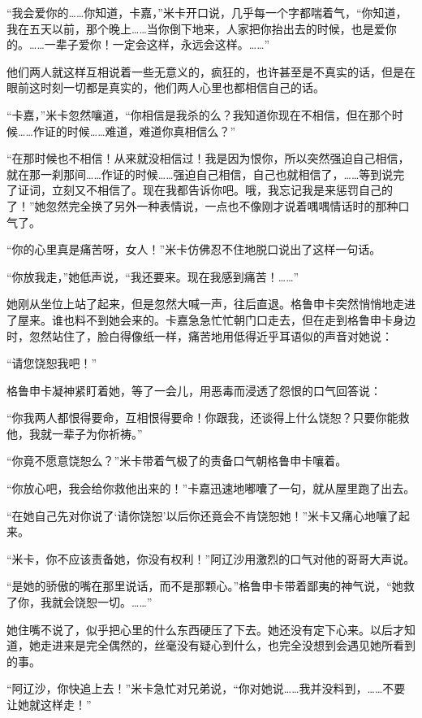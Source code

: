 \par “我会爱你的……你知道，卡嘉，”米卡开口说，几乎每一个字都喘着气，“你知道，我在五天以前，那个晚上……当你倒下地来，人家把你抬出去的时候，也是爱你的。……一辈子爱你！一定会这样，永远会这样。……”
\par 他们两人就这样互相说着一些无意义的，疯狂的，也许甚至是不真实的话，但是在眼前这时刻一切都是真实的，他们两人心里也都相信自己的话。
\par “卡嘉，”米卡忽然嚷道，“你相信是我杀的么？我知道你现在不相信，但在那个时候……作证的时候……难道，难道你真相信么？”
\par “在那时候也不相信！从来就没相信过！我是因为恨你，所以突然强迫自己相信，就在那一刹那间……作证的时候……强迫自己相信，自己也就相信了，……等到说完了证词，立刻又不相信了。现在我都告诉你吧。哦，我忘记我是来惩罚自己的了！”她忽然完全换了另外一种表情说，一点也不像刚才说着喁喁情话时的那种口气了。
\par “你的心里真是痛苦呀，女人！”米卡仿佛忍不住地脱口说出了这样一句话。
\par “你放我走，”她低声说，“我还要来。现在我感到痛苦！……”
\par 她刚从坐位上站了起来，但是忽然大喊一声，往后直退。格鲁申卡突然悄悄地走进了屋来。谁也料不到她会来的。卡嘉急急忙忙朝门口走去，但在走到格鲁申卡身边时，忽然站住了，脸白得像纸一样，痛苦地用低得近乎耳语似的声音对她说：
\par “请您饶恕我吧！”
\par 格鲁申卡凝神紧盯着她，等了一会儿，用恶毒而浸透了怨恨的口气回答说：
\par “你我两人都恨得要命，互相恨得要命！你跟我，还谈得上什么饶恕？只要你能救他，我就一辈子为你祈祷。”
\par “你竟不愿意饶恕么？”米卡带着气极了的责备口气朝格鲁申卡嚷着。
\par “你放心吧，我会给你救他出来的！”卡嘉迅速地嘟囔了一句，就从屋里跑了出去。
\par “在她自己先对你说了‘请你饶恕’以后你还竟会不肯饶恕她！”米卡又痛心地嚷了起来。
\par “米卡，你不应该责备她，你没有权利！”阿辽沙用激烈的口气对他的哥哥大声说。
\par “是她的骄傲的嘴在那里说话，而不是那颗心。”格鲁申卡带着鄙夷的神气说，“她救了你，我就会饶恕一切。……”
\par 她住嘴不说了，似乎把心里的什么东西硬压了下去。她还没有定下心来。以后才知道，她走进来是完全偶然的，丝毫没有疑心到什么，也完全没想到会遇见她所看到的事。
\par “阿辽沙，你快追上去！”米卡急忙对兄弟说，“你对她说……我并没料到，……不要让她就这样走！”
